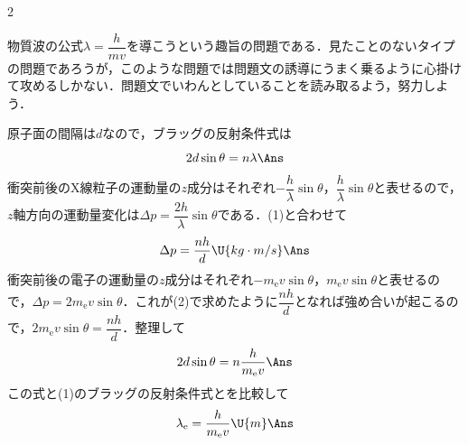 \begin{multicols}{2}
\par\nopagebreak
\begin{sisin}
物質波の公式$\lambda=\dfrac{h}{mv}$を導こうという趣旨の問題である．見たことのないタイプの問題であろうが，このような問題では問題文の誘導にうまく乗るように心掛けて攻めるしかない．問題文でいわんとしていることを読み取るよう，努力しよう．
\end{sisin}
\KaiHead
\begin{komon}
 原子面の間隔は$d$なので，ブラッグの反射条件式は
       \[2d\sin\theta=n\lambda\Ans\]
 衝突前後のX線粒子の運動量の$z$成分はそれぞれ$-\dfrac{h}{\lambda}\sin\theta$，$\dfrac{h}{\lambda}\sin\theta$と表せるので，$z$軸方向の運動量変化は$\Delta p=\dfrac{2h}{\lambda}\sin\theta$である．(1)と合わせて
       \[\Delta p=\frac{nh}{d}\U{kg\cdot m/s}\Ans\]
 衝突前後の電子の運動量の$z$成分はそれぞれ$-m_{\mathrm{e}}v\sin\theta$，$m_{\mathrm{e}}v\sin\theta$と表せるので，$\Delta p=2m_{\mathrm{e}}v\sin\theta$．これが(2)で求めたように$\dfrac{nh}{d}$となれば強め合いが起こるので，$2m_{\mathrm{e}}v\sin\theta=\dfrac{nh}{d}$．整理して
       \[2d\sin\theta=n\frac{h}{m_{\mathrm{e}}v}\Ans\]
 この式と(1)のブラッグの反射条件式とを比較して
       \[\lambda_{\mathrm{e}}=\frac{h}{m_{\mathrm{e}}v}\U{m}\Ans\]
\end{komon}


\end{multicols}
